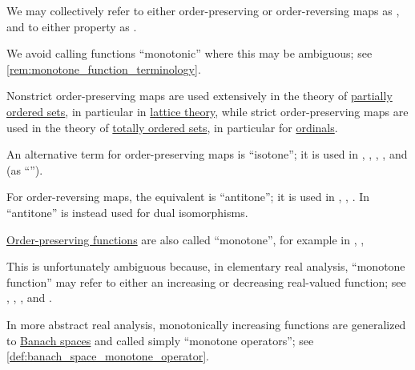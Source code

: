 \begin{definition}
\begin{thmenum}
     We may collectively refer to either order-preserving or order-reversing maps as , and to either property as .

    We avoid calling functions \enquote{monotonic} where this may be ambiguous; see \cref{rem:monotone_function_terminology}.
  \end{thmenum}
\end{definition}
\begin{comments}
  \item Nonstrict order-preserving maps are used extensively in the theory of \hyperref[sec:partially_ordered_sets]{partially ordered sets}, in particular in \hyperref[sec:lattices]{lattice theory}, while strict order-preserving maps are used in the theory of \hyperref[sec:partially_ordered_sets]{totally ordered sets}, in particular for \hyperref[sec:ordinals]{ordinals}.

  \item An alternative term for order-preserving maps is \enquote{isotone}; it is used in
  \cite[2]{Birkhoff1967LatticeTheory},
  \cite[30]{Grätzer2011LatticeTheory},
  \cite[def. 1.34(i)]{DaveyPriestley2002LatticeTheory},
  \cite[def. 9.2]{Harzheim2005OrderedSets},
  \cite[\S 3.17]{Schechter1997AnalysisHandbook} and
  \cite[def. 3.9]{Гуров2013ТеорияРешёток} (as \enquote{}).

  For order-reversing maps, the equivalent is \enquote{antitone}; it is used in
  \cite[30]{Grätzer2011LatticeTheory},
  \cite[def. 1.34(i)]{DaveyPriestley2002LatticeTheory},
  \cite[\S 3.17]{Schechter1997AnalysisHandbook}. In \cite[2]{Birkhoff1967LatticeTheory} \enquote{antitone} is instead used for dual isomorphisms.
\end{comments}

\begin{remark}\label{rem:monotone_function_terminology}
  \hyperref[def:order_function/preserving]{Order-preserving functions} are also called \enquote{monotone}, for example in
  \cite[30]{Grätzer2011LatticeTheory},
  \cite[def. 1.34(i)]{DaveyPriestley2002LatticeTheory},
  \cite[6]{Aigner1997CombinatorialTheory}

  This is unfortunately ambiguous because, in elementary real analysis, \enquote{monotone function} may refer to either an increasing or decreasing real-valued function; see
  \cite[12]{Folland1999RealAnalysis},
  \cite[119]{Tao2022AnalysisI},
  \cite[\S 47]{Фихтенгольц1968ОсновыАнализаТом1},
  \cite[192]{Натансон1974ВещественныйАнализ} and
  \cite[126]{Зорич2019АнализЧасть1}.

  In more abstract real analysis, monotonically increasing functions are generalized to \hyperref[def:banach_space]{Banach spaces} and called simply \enquote{monotone operators}; see \cref{def:banach_space_monotone_operator}.
\end{remark}

